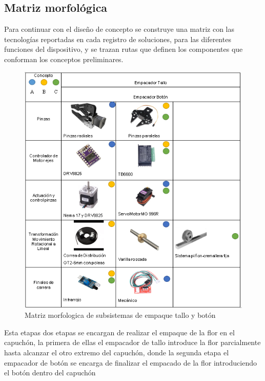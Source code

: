 \subsection{Matriz morfológica}
Para continuar con el diseño de concepto se construye una matriz con las tecnologías
reportadas en cada registro de soluciones, para las diferentes funciones del dispositivo, y
se trazan rutas que definen los componentes que conforman los conceptos preliminares.
\begin{figure}[H]
	\centering
	\includegraphics{Figuras/Empacador}
	\caption{Matriz morfologica de subsistemas de empaque tallo y botón}
	\label{fig:MMEmpaque}
\end{figure}
Esta etapas dos etapas se encargan de realizar el empaque de la flor en el capuchón, la primera de ellas el empacador de tallo introduce la flor parcialmente hasta alcanzar el otro extremo del capuchón, donde la segunda etapa el empacador de botón se encarga de finalizar el empacado de la flor introduciendo el botón dentro del capuchón 
